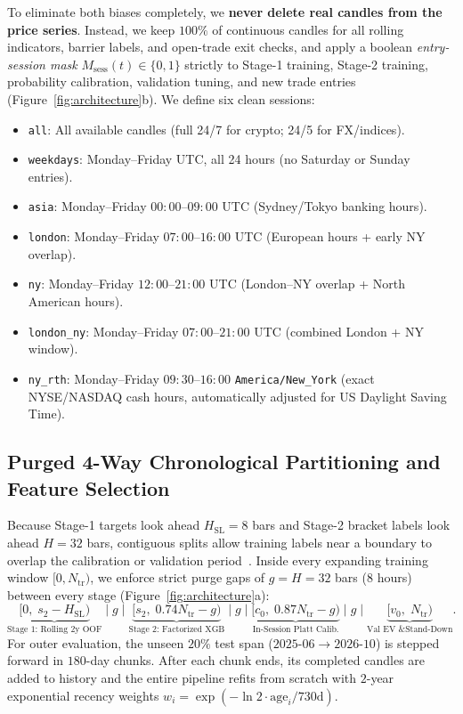 \documentclass{article}
\newcommand{\SL}{\mathrm{SL}}
\begin{document}
To eliminate both biases completely, we \textbf{never delete real candles from the price series}. Instead, we keep $100\%$ of continuous candles for all rolling indicators, barrier labels, and open-trade exit checks, and apply a boolean \emph{entry-session mask} $M_{\mathrm{sess}}(t) \in \{0, 1\}$ strictly to Stage-1 training, Stage-2 training, probability calibration, validation tuning, and new trade entries (Figure~\ref{fig:architecture}b). We define six clean sessions:
\begin{itemize}
    \item \texttt{all}: All available candles (full 24/7 for crypto; 24/5 for FX/indices).
    \item \texttt{weekdays}: Monday--Friday UTC, all 24 hours (no Saturday or Sunday entries).
    \item \texttt{asia}: Monday--Friday $00{:}00$--$09{:}00$ UTC (Sydney/Tokyo banking hours).
    \item \texttt{london}: Monday--Friday $07{:}00$--$16{:}00$ UTC (European hours + early NY overlap).
    \item \texttt{ny}: Monday--Friday $12{:}00$--$21{:}00$ UTC (London--NY overlap + North American hours).
    \item \texttt{london\_ny}: Monday--Friday $07{:}00$--$21{:}00$ UTC (combined London + NY window).
    \item \texttt{ny\_rth}: Monday--Friday $09{:}30$--$16{:}00$ \texttt{America/New\_York} (exact NYSE/NASDAQ cash hours, automatically adjusted for US Daylight Saving Time).
\end{itemize}

\subsection{Purged 4-Way Chronological Partitioning and Feature Selection}

Because Stage-1 targets look ahead $H_{\SL} = 8$ bars and Stage-2 bracket labels look ahead $H = 32$ bars, contiguous splits allow training labels near a boundary to overlap the calibration or validation period~\citep{LopezDePrado2018}. Inside every expanding training window $[0, N_{\mathrm{tr}})$, we enforce strict purge gaps of $g = H = 32$ bars ($8$ hours) between every stage (Figure~\ref{fig:architecture}a):
\begin{equation}
  \underbrace{[0,\; s_2 - H_{\SL})}_{\text{Stage 1: Rolling 2y OOF}}
  \;\Big|\; g \;\Big|\;
  \underbrace{[s_2,\; 0.74 N_{\mathrm{tr}} - g)}_{\text{Stage 2: Factorized XGB}}
  \;\Big|\; g \;\Big|\;
  \underbrace{[c_0,\; 0.87 N_{\mathrm{tr}} - g)}_{\text{In-Session Platt Calib.}}
  \;\Big|\; g \;\Big|\;
  \underbrace{[v_0,\; N_{\mathrm{tr}})}_{\text{Val EV \& Stand-Down}}.
  \label{eq:purged_split}
\end{equation}
For outer evaluation, the unseen $20\%$ test span ($2025\text{-}06 \to 2026\text{-}10$) is stepped forward in $180$-day chunks. After each chunk ends, its completed candles are added to history and the entire pipeline refits from scratch with $2$-year exponential recency weights $w_i = \exp(-\ln 2 \cdot \mathrm{age}_i / 730\text{d})$.
\end{document}
